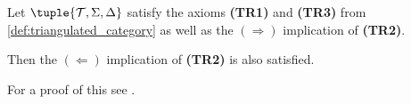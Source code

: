 \begin{lemma}
    \label{lem:triangulated_category-TR2-only_one_rotation}
    Let \( \tuple{ \Tc, \Sigma, \Delta } \) satisfy the axioms {\bf (TR1)} and {\bf (TR3)} from \autoref{def:triangulated_category} as well as the \( (\Rightarrow) \) implication of {\bf (TR2)}.

    Then the \( (\Leftarrow) \) implication of {\bf (TR2)} is also satisfied.
\end{lemma}
For a proof of this see \cite[Lemma 2.4]{May_2001}.

